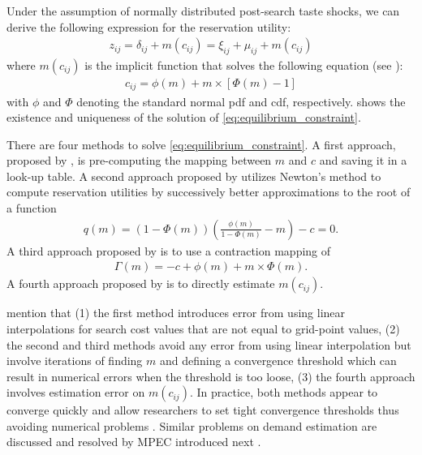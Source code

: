 \documentclass[12pt]{article}
\begin{document}
Under the assumption of normally distributed post-search taste shocks, we can derive the following
expression for the reservation utility:
\begin{align}
    z_{i j}=\delta_{i j}+m\left(c_{i j}\right)=\xi_{i j}+\mu_{i j}+m\left(c_{i j}\right) 
\end{align}
where \(m\left(c_{i j} \right)\) is the implicit function that solves the following equation (see \cite{kim2010online}):
\begin{align}
    c_{i j}=\phi(m)+m \times[\Phi(m)-1] \label{eq:equilibrium_constraint}
\end{align}
with \(\phi\) and \(\Phi\) denoting the standard normal pdf and cdf, respectively. \cite{weitzman1979optimal} shows the existence and uniqueness of the solution of \eqref{eq:equilibrium_constraint}.

There are four methods to solve \eqref{eq:equilibrium_constraint}. 
A first approach, proposed by \cite{kim2010online}, is pre-computing the mapping between $m$ and $c$ and saving it in a look-up table.
A second approach proposed by \cite{jiang2021consumer} utilizes Newton's method to compute reservation utilities by successively better approximations to the root
of a function 
\begin{align*}
    q(m)=(1-\Phi(m))\left(\frac{\phi(m)}{1-\Phi(m)}-m\right)-c=0.
\end{align*}
A third approach proposed by \cite{elberg2019dynamic} is to use a contraction mapping of
\begin{align*}
    \Gamma(m)=-c+\phi(m)+m \times \Phi(m).
\end{align*}
A fourth approach proposed by \cite{morozov2023measuring} is to directly estimate $m(c_{ij})$.

\cite{ursu2023sequential} mention that (1) the first method introduces error from using linear interpolations for search cost
values that are not equal to grid-point values, (2) the second and third methods avoid any error from using linear interpolation but involve iterations of finding $m$ and defining a convergence threshold which can result in numerical errors when the threshold is too loose, (3) the fourth approach involves estimation error on $m(c_{ij})$. 
In practice, both methods appear to converge quickly and allow researchers to set tight convergence thresholds thus avoiding numerical problems \citep{ursu2023sequential}. 
Similar problems on demand estimation are discussed and resolved by MPEC introduced next \citep{dube2012improving}. 
\end{document}
